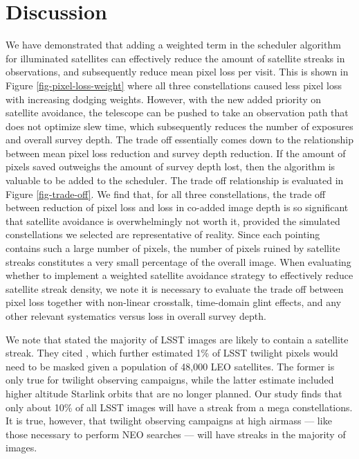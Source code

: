 \documentclass[twocolumn]{aastex631}
\begin{document}
\section{Discussion}\label{discuss}

We have demonstrated that adding a weighted term in the scheduler algorithm for illuminated satellites can effectively reduce the amount of satellite streaks in observations, and subsequently reduce mean pixel loss per visit. This is shown in Figure \ref{fig-pixel-loss-weight} where all three constellations caused less pixel loss with increasing dodging weights. However, with the new added priority on satellite avoidance, the telescope can be pushed to take an observation path that does not optimize slew time, which subsequently reduces the number of exposures and overall survey depth. The trade off essentially comes down to the relationship between mean pixel loss reduction and survey depth reduction. If the amount of pixels saved outweighs the amount of survey depth lost, then the algorithm is valuable to be added to the scheduler. The trade off relationship is evaluated in Figure \ref{fig-trade-off}. We find that, for all three constellations, the trade off between reduction of pixel loss and loss in co-added image depth is so significant that satellite avoidance is overwhelmingly not worth it, provided the simulated constellations we selected are representative of reality. Since each pointing contains such a large number of pixels, the number of pixels ruined by satellite streaks constitutes a very small percentage of the overall image.
When evaluating whether to implement a weighted satellite avoidance strategy to effectively reduce satellite streak density, we note it is necessary to evaluate the trade off between pixel loss together with non-linear crosstalk, time-domain glint effects, and any other relevant systematics versus loss in overall survey depth. 

We note that \citet{lawrence22} stated the majority of LSST images are likely to contain a satellite streak. They cited \citet{tyson20}, which further estimated 1\% of LSST twilight pixels would need to be masked given a population of 48,000 LEO satellites. The former is only true for twilight observing campaigns, while the latter estimate included higher altitude Starlink orbits that are no longer planned. Our study finds that only about 10\% of all LSST images will have a streak from a mega constellations. It is true, however, that twilight observing campaigns at high airmass --- like those necessary to perform NEO searches --- will have streaks in the majority of images.
\end{document}
